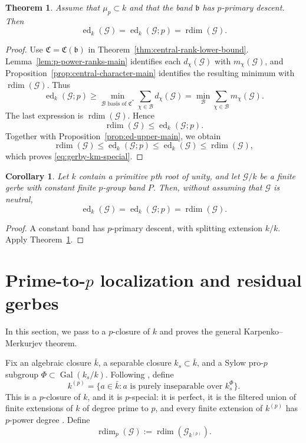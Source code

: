 \documentclass[11pt,reqno]{amsart}
\numberwithin{equation}{section}
\theoremstyle{plain}
\newtheorem{theo}[prop]{Theorem}
\newtheorem{coro}[prop]{Corollary}
\theoremstyle{definition}
\def\cG{{\mathcal G}}
\def\fC{{\mathfrak C}}
\def\rdim{{\operatorname{rdim}}}
\def\ed{{\operatorname{ed}}}
\def\band{{\mathfrak b}}
\begin{document}
\begin{theo}
\label{thm:gerby-km-special}
Assume that $\mu_p\subset k$ and that the band $\band$ has
$p$-primary descent.  Then
\begin{equation}\label{eq:gerby-km-special}
\ed_k(\cG)=\ed_k(\cG;p)=\rdim(\cG).
\end{equation}
\end{theo}

\begin{proof}
Use $\fC=\fC(\band)$ in Theorem~\ref{thm:central-rank-lower-bound}. Lemma~\ref{lem:p-power-ranks-main} identifies each
$d_\chi(\cG)$ with $m_\chi(\cG)$, and
Proposition~\ref{prop:central-character-main} identifies the resulting
minimum with $\rdim(\cG)$.  Thus
\[
\ed_k(\cG;p)\ge
\min_{\mathcal B\text{ basis of }\fC^*}
\sum_{\chi\in\mathcal B}d_\chi(\cG)
=
\min_{\mathcal B}
\sum_{\chi\in\mathcal B}m_\chi(\cG).
\]
The last expression is $\rdim(\cG)$.  Hence
\[
\rdim(\cG)\le\ed_k(\cG;p).
\]
Together with Proposition~\ref{prop:ed-upper-main}, we obtain
\[
\rdim(\cG)
\le\ed_k(\cG;p)
\le\ed_k(\cG)
\le\rdim(\cG),
\]
which proves \eqref{eq:gerby-km-special}.
\end{proof}


\begin{coro}
\label{cor:constant-band}
Let $k$ contain a primitive $p$th root of unity, and let $\cG/k$ be
a finite gerbe with constant finite $p$-group band $P$.  Then, without
assuming that $\cG$ is neutral,
\[
\ed_k(\cG)=\ed_k(\cG;p)=\rdim(\cG).
\]
\end{coro}

\begin{proof}
A constant band has $p$-primary descent, with splitting extension $k/k$.
Apply Theorem~\ref{thm:gerby-km-special}.
\end{proof}

\section{Prime-to-\texorpdfstring{$p$}{p} localization and residual gerbes}
\label{sec:p-localization}

In this section, we pass to a $p$-closure of $k$ and proves
the general Karpenko--Merkurjev theorem.

Fix an algebraic closure $\bar k$, a separable closure
$k_s\subset\bar k$, and a Sylow pro-$p$ subgroup
$\Phi\subset\operatorname{Gal}(k_s/k)$.  Following
\cite[Section~2]{LMMR13}, define
\[
k^{(p)}
=
\{a\in\bar k:
a\text{ is purely inseparable over }k_s^\Phi\}.
\]
This is a $p$-closure of $k$, and it is $p$-special: it is perfect,
it is the filtered
union of finite extensions of $k$ of degree prime to $p$, and every
finite extension of $k^{(p)}$ has $p$-power degree
\cite[Lemma~2.1, Lemma~2.2]{LMMR13}.  Define
\[
\rdim_p(\cG):=\rdim(\cG_{k^{(p)}}).
\]
\end{document}
